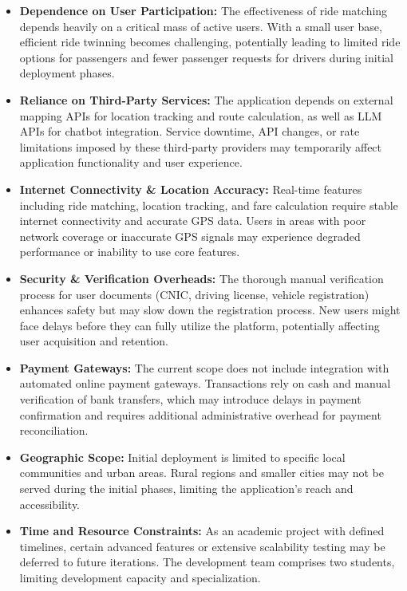 \begin{itemize}
    \item \textbf{Dependence on User Participation:} The effectiveness of ride matching depends heavily on a critical mass of active users. With a small user base, efficient ride twinning becomes challenging, potentially leading to limited ride options for passengers and fewer passenger requests for drivers during initial deployment phases.
    
    \item \textbf{Reliance on Third-Party Services:} The application depends on external mapping APIs for location tracking and route calculation, as well as LLM APIs for chatbot integration. Service downtime, API changes, or rate limitations imposed by these third-party providers may temporarily affect application functionality and user experience.
    
    \item \textbf{Internet Connectivity \& Location Accuracy:} Real-time features including ride matching, location tracking, and fare calculation require stable internet connectivity and accurate GPS data. Users in areas with poor network coverage or inaccurate GPS signals may experience degraded performance or inability to use core features.
    
    \item \textbf{Security \& Verification Overheads:} The thorough manual verification process for user documents (CNIC, driving license, vehicle registration) enhances safety but may slow down the registration process. New users might face delays before they can fully utilize the platform, potentially affecting user acquisition and retention.
    
    \item \textbf{Payment Gateways:} The current scope does not include integration with automated online payment gateways. Transactions rely on cash and manual verification of bank transfers, which may introduce delays in payment confirmation and requires additional administrative overhead for payment reconciliation.
    
    \item \textbf{Geographic Scope:} Initial deployment is limited to specific local communities and urban areas. Rural regions and smaller cities may not be served during the initial phases, limiting the application's reach and accessibility.
    
    \item \textbf{Time and Resource Constraints:} As an academic project with defined timelines, certain advanced features or extensive scalability testing may be deferred to future iterations. The development team comprises two students, limiting development capacity and specialization.
\end{itemize}

